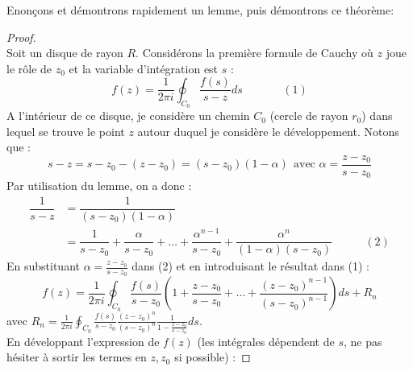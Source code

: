 	Enonçons et démontrons rapidement un lemme, puis démontrons ce théorème:\\
	
	
	\begin{proof}\ \\
	Soit un disque de rayon $R$. Considérons la première formule de Cauchy où $z$ joue le rôle 
	de $z_0$ et la variable d'intégration est $s$ :
	\begin{equation}
	f(z) = \frac{1}{2\pi i}\oint_{C_0} \frac{f(s)}{s-z}ds\ \ \ \ \ \ \  \ \ \ \ \ \ \ \ \ (1)
	\end{equation}
	A l'intérieur de ce disque, je considère un chemin $C_0$ (cercle de rayon $r_0$) dans lequel
	 se trouve le point $z$ autour duquel je considère le développement. Notons que :
	\begin{equation}
	s-z = s-z_0-(z-z_0) = (s-z_0)(1-\alpha)\ \ \text{avec } \alpha = \frac{z-z_0}{s-z_0}
	\end{equation}
	Par utilisation du lemme, on a donc :
	\begin{equation}
	\begin{array}{ll}
	\dfrac{1}{s-z} &= \dfrac{1}{(s-z_0)(1-\alpha)}\\
	 &= \dfrac{1}{s-z_0}+\dfrac{\alpha}{s-z_0}+\dots+\dfrac{\alpha^{n-1}}{s-z_0}+\dfrac{\alpha^n}{
	 (1-\alpha)(s-z_0)} \ \ \ \ \ \ \ \ \ \ \ \ \ (2)
	\end{array}
	\end{equation}
	En substituant $\alpha = \frac{z-z_0}{s-z_0}$ dans (2) et en introduisant le résultat dans
	(1) :
	\begin{equation}
	f(z) = \frac{1}{2\pi i}\oint_{C_0} \frac{f(s)}{s-z_0}\left(1 + \dfrac{z-z_0}{s-z_0} + \dots +
	\dfrac{(z-z_0)^{n-1}}{(s-z_0)^{n-1}}\right)ds + R_n
	\end{equation}
	avec $R_n = \frac{1}{2\pi i}\oint_{C_0} \frac{f(s)}{s-z_0}\frac{(z-z_0)^n}{(s-z_0)^n}\frac{
	1}{1-\frac{z-z_0}{s-z_0}}ds$.\\
	En développant l'expression de $f(z)$ (les intégrales dépendent de $s$, ne pas hésiter à 
	sortir les termes en $z, z_0$ si possible) :

\end{proof}
